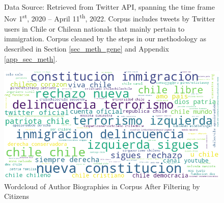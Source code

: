\begin{figure}
{                %
                Data Source: Retrieved from Twitter API, spanning the time frame Nov 1\textsuperscript{st}, 2020 -- April 11\textsuperscript{th}, 2022. Corpus includes tweets by Twitter users in Chile or Chilean nationals that mainly pertain to immigration. Corpus cleaned by the steps in our methodology as described in Section \ref{sec_meth_gene} and Appendix \ref{app_sec_meth}.}
        \end{figure}
        
        \begin{figure}[!htb]
            \centering
            \includegraphics[width = 15cm]{figs/auth_desc_cloud}
            \caption{Wordcloud of Author Biographies in Corpus After Filtering by Citizens}
            \label{appfig_auth_desc_cloud}
        \end{figure}
        
        
